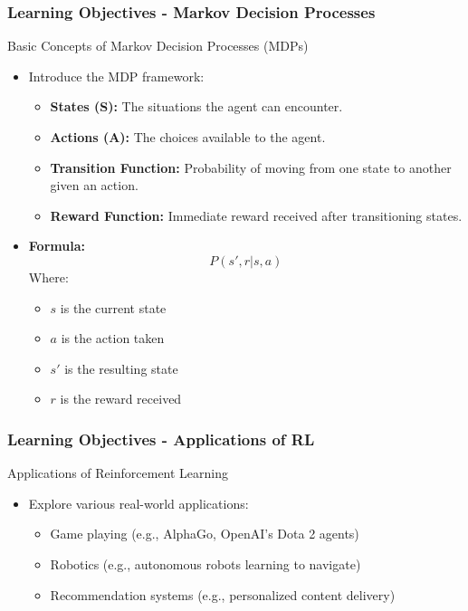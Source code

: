 \documentclass{beamer}
\begin{document}
\begin{frame}[fragile]
    \frametitle{Learning Objectives - Markov Decision Processes}
    \begin{block}{Basic Concepts of Markov Decision Processes (MDPs)}
        \begin{itemize}
            \item Introduce the MDP framework:
            \begin{itemize}
                \item \textbf{States (S):} The situations the agent can encounter.
                \item \textbf{Actions (A):} The choices available to the agent.
                \item \textbf{Transition Function:} Probability of moving from one state to another given an action.
                \item \textbf{Reward Function:} Immediate reward received after transitioning states.
            \end{itemize}
            \item \textbf{Formula:}
            \begin{equation}
                P(s', r | s, a)
            \end{equation}
            Where:
            \begin{itemize}
                \item \( s \) is the current state
                \item \( a \) is the action taken
                \item \( s' \) is the resulting state
                \item \( r \) is the reward received
            \end{itemize}
        \end{itemize}
    \end{block}
\end{frame}

\begin{frame}[fragile]
    \frametitle{Learning Objectives - Applications of RL}
    \begin{block}{Applications of Reinforcement Learning}
        \begin{itemize}
            \item Explore various real-world applications:
            \begin{itemize}
                \item Game playing (e.g., AlphaGo, OpenAI's Dota 2 agents)
                \item Robotics (e.g., autonomous robots learning to navigate)
                \item Recommendation systems (e.g., personalized content delivery)
            \end{itemize}
        \end{itemize}
    \end{block}
\end{frame}
\end{document}

